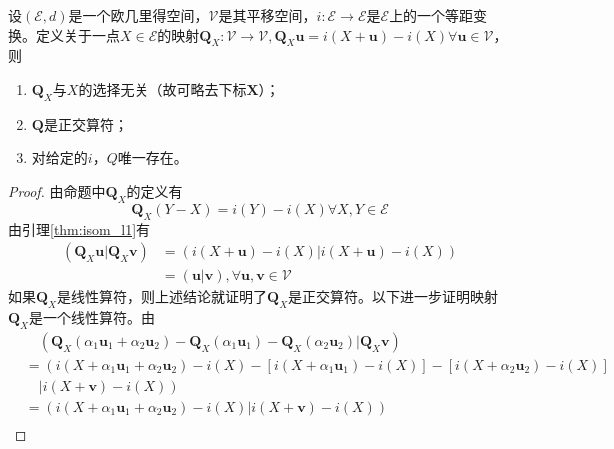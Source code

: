 \documentclass[main.tex]{subfiles}
\begin{document}
\begin{lemma}\label{thm:isom_l2}
    设$\left(\mathcal{E},d\right)$是一个欧几里得空间，$\mathcal{V}$是其平移空间，$i:\mathcal{E}\rightarrow\mathcal{E}$是$\mathcal{E}$上的一个等距变换。定义关于一点$X\in\mathcal{E}$的映射$\mathbf{Q}_X:\mathcal{V}\rightarrow\mathcal{V},\mathbf{Q}_X\mathbf{u}=i\left(X+\mathbf{u}\right)-i\left(X\right)\forall\mathbf{u}\in\mathcal{V}$，则
    \begin{enumerate}
        \item $\mathbf{Q}_X$与$X$的选择无关（故可略去下标$\mathbf{X}$）；
        \item $\mathbf{Q}$是正交算符；
        \item 对给定的$i$，$Q$唯一存在。
    \end{enumerate}
\end{lemma}
\begin{proof}
    由命题中$\mathbf{Q}_X$的定义有
    \[
        \mathbf{Q}_X\left(Y-X\right)=i\left(Y\right)-i\left(X\right)\forall X,Y\in\mathcal{E}
    \]
    由引理\ref{thm:isom_l1}有
    \begin{align*}
        \left(\mathbf{Q}_X\mathbf{u}|\mathbf{Q}_X\mathbf{v}\right) & =\left(i\left(X+\mathbf{u}\right)-i\left(X\right)|i\left(X+\mathbf{u}\right)-i\left(X\right)\right) \\
                                                                   & =\left(\mathbf{u}|\mathbf{v}\right),\forall\mathbf{u},\mathbf{v}\in\mathcal{V}
    \end{align*}
    如果$\mathbf{Q}_X$是线性算符，则上述结论就证明了$\mathbf{Q}_X$是正交算符。以下进一步证明映射$\mathbf{Q}_X$是一个线性算符。由
    \begin{align*}
         & \quad\left(\mathbf{Q}_X\left(\alpha_1\mathbf{u}_1+\alpha_2\mathbf{u}_2\right)-\mathbf{Q}_X\left(\alpha_1\mathbf{u}_1\right)-\mathbf{Q}_X\left(\alpha_2\mathbf{u}_2\right)|\mathbf{Q}_X\mathbf{v}\right)                     & \\
         & =\left(i\left(X+\alpha_1\mathbf{u}_1+\alpha_2\mathbf{u}_2\right)-i\left(X\right)-\left[i\left(X+\alpha_1\mathbf{u}_1\right)-i\left(X\right)\right]-\left[i\left(X+\alpha_2\mathbf{u}_2\right)-i\left(X\right)\right]\right.   \\
         & \quad\left|i\left(X+\mathbf{v}\right)-i\left(X\right)\right)                                                                                                                                                                  \\
         & =\left(i\left(X+\alpha_1\mathbf{u}_1+\alpha_2\mathbf{u}_2\right)-i\left(X\right)|i\left(X+\mathbf{v}\right)-i\left(X\right)\right)                                                                                            \\

\end{align*}
\end{proof}
\end{document}
